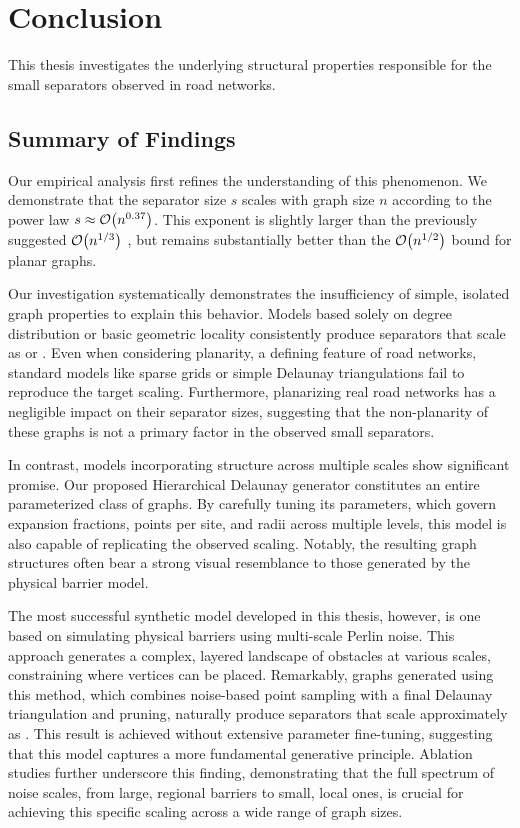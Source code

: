 \chapter{Conclusion}
\label{ch:conclusion}

This thesis investigates the underlying structural properties responsible for the small separators observed in road networks.

\section{Summary of Findings}
\label{sec:conclusion:summary}

Our empirical analysis first refines the understanding of this phenomenon.
We demonstrate that the separator size \(s\) scales with graph size \(n\) according to the power law \(s \approx \mathcal{O}\!\left(n^{0.37}\right)\).
This exponent is slightly larger than the previously suggested \(\mathcal{O}\!\left(n^{1/3}\right)\) \cite{dibbelt_customizable_2016}, but remains substantially better than the \(\mathcal{O}\!\left(n^{1/2}\right)\) bound for planar graphs.

Our investigation systematically demonstrates the insufficiency of simple, isolated graph properties to explain this behavior.
Models based solely on degree distribution or basic geometric locality consistently produce separators that scale as  or .
Even when considering planarity, a defining feature of road networks, standard models like sparse grids or simple Delaunay triangulations fail to reproduce the target scaling.
Furthermore, planarizing real road networks has a negligible impact on their separator sizes, suggesting that the non-planarity of these graphs is not a primary factor in the observed small separators.

In contrast, models incorporating structure across multiple scales show significant promise.
Our proposed Hierarchical Delaunay generator constitutes an entire parameterized class of graphs.
By carefully tuning its parameters, which govern expansion fractions, points per site, and radii across multiple levels, this model is also capable of replicating the observed  scaling.
Notably, the resulting graph structures often bear a strong visual resemblance to those generated by the physical barrier model.

The most successful synthetic model developed in this thesis, however, is one based on simulating physical barriers using multi-scale Perlin noise.
This approach generates a complex, layered landscape of obstacles at various scales, constraining where vertices can be placed.
Remarkably, graphs generated using this method, which combines noise-based point sampling with a final Delaunay triangulation and pruning, naturally produce separators that scale approximately as .
This result is achieved without extensive parameter fine-tuning, suggesting that this model captures a more fundamental generative principle.
Ablation studies further underscore this finding, demonstrating that the full spectrum of noise scales, from large, regional barriers to small, local ones, is crucial for achieving this specific scaling across a wide range of graph sizes.

